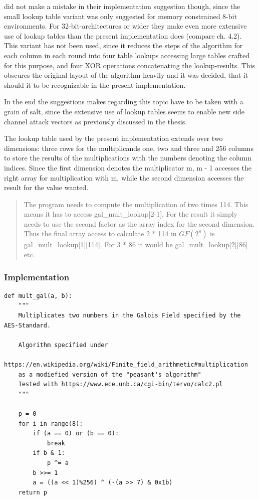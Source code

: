 \cite{rijndael} did not
make a mistake in their implementation suggestion though, since the
small lookup table variant was only suggested for memory constrained
8-bit environments. For 32-bit-architectures or wider they make even more
extensive use of lookup tables than the present implementation does
(compare ch. 4.2). This variant has not been used, since it reduces the
steps of the algorithm for each column in each round into four table
lookups accessing large tables crafted for this purpose, and four XOR
operations concatenating the lookup-results. This obscures the original
layout of the algorithm heavily and it was decided, that it should it to be recognizable
in the present implementation.

In the end the suggestions \cite{rijndael} makes regarding this topic have to
be taken with a grain of salt, since the extensive use of lookup tables
seems to enable new side channel attack vectors as previously discussed in the thesis.

The lookup table used by the present implementation extends over two
dimensions: three rows for the multiplicands one, two and three and 256
columns to store the results of the multiplications with the numbers
denoting the column indices. Since the first dimension denotes the
multiplicator m, m - 1 accesses the right array for multiplication with
m, while the second dimension accesses the result for the value wanted.

\begin{quote}
The program needs to compute the multiplication of two times 114. This
means it has to access gal\_mult\_lookup[2-1]. For the result it
simply needs to use the second factor as the array index for the second
dimension. Thus the final array access to calculate 2 * 114 in $GF(2^{8})$ is
gal\_mult\_lookup[1][114]. For 3 * 86 it would be
gal\_mult\_lookup[2][86] etc.
\end{quote}

\hypertarget{implementation}{%
\subsubsection{Implementation}\label{implementation}}

\begin{lstlisting}
def mult_gal(a, b):
    """
    Multiplicates two numbers in the Galois Field specified by the AES-Standard.

    Algorithm specified under
    https://en.wikipedia.org/wiki/Finite_field_arithmetic#multiplication
    as a modiefied version of the "peasant's algorithm"
    Tested with https://www.ece.unb.ca/cgi-bin/tervo/calc2.pl
    """
    
    p = 0
    for i in range(8):
        if (a == 0) or (b == 0):
            break
        if b & 1:
            p ^= a
        b >>= 1
        a = ((a << 1)%256) ^ (-(a >> 7) & 0x1b)
    return p
\end{lstlisting}

